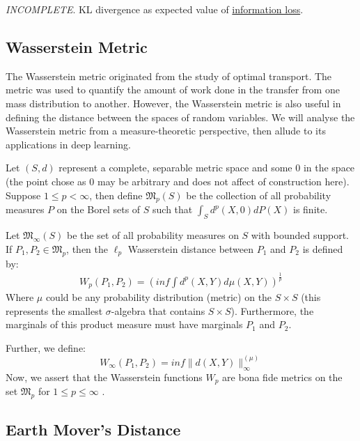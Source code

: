 \documentclass[paper=a4, fontsize=12pt]{scrartcl} %
\numberwithin{equation}{section} %
\numberwithin{figure}{section} %
\numberwithin{table}{section} %
\begin{document}
\textit{INCOMPLETE}. KL divergence as expected value of \href{https://www.countbayesie.com/blog/2017/5/9/kullback-leibler-divergence-explained}{information loss}.

\subsection{Wasserstein Metric} 

The Wasserstein metric originated from the study of optimal transport. 
The metric was used to quantify the amount of work done in the transfer from one mass distribution to another. However, the Wasserstein metric is also 
useful in defining the distance between the spaces of random variables. We will analyse the Wasserstein metric from a 
measure-theoretic perspective, then allude to its applications in deep learning.

Let $(S, d)$ represent a complete, separable metric space and some $0$ in the space (the point chose as $0$ may be arbitrary 
and does not affect of construction here). Suppose $1 \le p < \infty$, then define $\mathfrak{M}_p(S)$ be the collection of 
all probability measures $P$ on the Borel sets of $S$ such that $\int_S d^p(X, 0) dP(X)$ is finite.

Let $\mathfrak{M}_\infty(S)$ be the set of all probability measures on $S$ with bounded support. If $P_1, P_2 \in \mathfrak{M}_p$, then 
the $\ell_p$ Wasserstein distance between $P_1$ and $P_2$ is defined by:
\begin{align*}
    W_p(P_1, P_2) = \left( inf \int d^p(X, Y) d\mu(X, Y) \right)^{\frac{1}{p}}
\end{align*}
Where $\mu$ could be any probability distribution (metric) on the $S \times S$ (this represents the smallest $\sigma$-algebra that contains $S \times S$).
Furthermore, the marginals of this product measure must have marginals $P_1$ and $P_2$.

Further, we define:
\begin{equation}
    W_\infty(P_1, P_2) = inf \| d(X, Y) \|^{(\mu)}_\infty
\end{equation}
Now, we assert that the Wasserstein functions $W_p$ are bona fide metrics on the set $\mathfrak{M}_p$ for $1 \le p \le \infty$ \cite{wass}.

\subsection{Earth Mover's Distance} %
\end{document}

